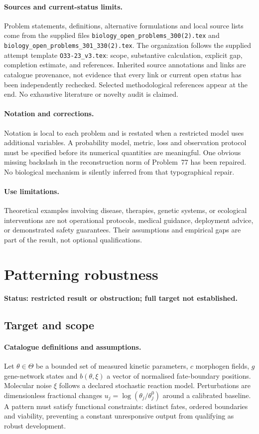 \documentclass[11pt]{article}
\begin{document}
\paragraph{Sources and current-status limits.}
Problem statements, definitions, alternative formulations and local source lists
come from the supplied files
\texttt{biology\_open\_problems\_300(2).tex} and
\texttt{biology\_open\_problems\_301\_330(2).tex}.
The organization follows the supplied attempt template
\texttt{O33-23\_v3.tex}: scope, substantive calculation, explicit gap,
completion estimate, and references. Inherited source annotations and links are
catalogue provenance, not evidence that every link or current open status has
been independently rechecked. Selected methodological references appear at the
end. No exhaustive literature or novelty audit is claimed.

\paragraph{Notation and corrections.}
Notation is local to each problem and is restated when a restricted model uses
additional variables. A probability model, metric, loss and observation protocol
must be specified before its numerical quantities are meaningful. One obvious
missing backslash in the reconstruction norm of Problem~77 has been repaired.
No biological mechanism is silently inferred from that typographical repair.

\paragraph{Use limitations.}
Theoretical examples involving disease, therapies, genetic systems, or ecological
interventions are not operational protocols, medical guidance, deployment advice,
or demonstrated safety guarantees. Their assumptions and empirical gaps are part
of the result, not optional qualifications.


\section*{Patterning robustness}
\label{prob:124}
\noindent\textbf{Status: restricted result or obstruction; full target not established.}
\subsection{Target and scope}
\paragraph{Catalogue definitions and assumptions.}
Let $\theta\in\Theta$ be a bounded set of measured kinetic parameters, $c$ morphogen fields, $g$ gene-network states and $b(\theta,\xi)$ a vector of normalised fate-boundary positions. Molecular noise $\xi$ follows a declared stochastic reaction model. Perturbations are dimensionless fractional changes $u_j=\log(\theta_j/\theta_j^0)$ around a calibrated baseline. A pattern must satisfy functional constraints: distinct fates, ordered boundaries and viability, preventing a constant unresponsive output from qualifying as robust development.
\end{document}
